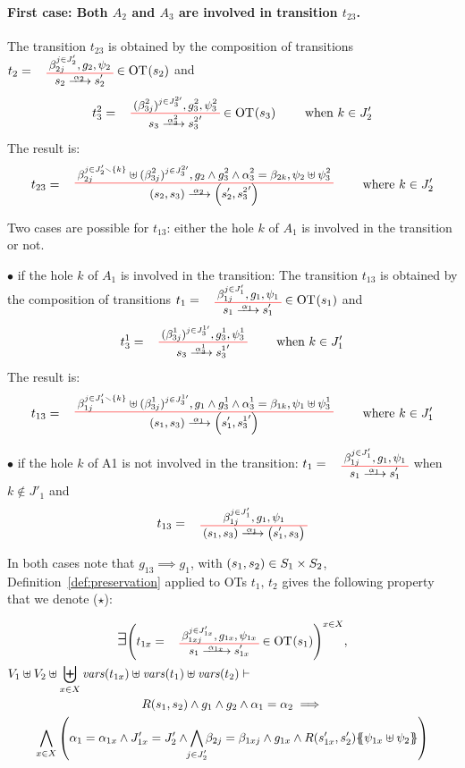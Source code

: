 \documentclass[runningheads]{llncs}
\begin{document}
\begin{enumerate}
\paragraph{First case: Both $A_2$ and $A_3$ are involved in transition $t_{23}$.}
The transition $t_{23}$ is obtained by the composition of  transitions $t_2=\OTx{2}{}{2}{2}\in\fOT{s_2}$ and  \[t_3^2=
\OT{ s_3}{{s^2_3}'}{\alpha_3^2}{   {(\beta^2_{3j})^{j \in J^{2 \prime}_3} }}{ g^2_3 }{ \psi^2_3}\in\fOT{s_3} \qquad \text{ when } k \in J'_{2} 
\] The result is:
\[
t_{23} = \OT{\mpar{s_2, s_3}}{\mpar{s'_2, {s^2_3}'}}{\alpha_2}{\beta_{2j}^{j \in J'_2 \setminus \{k\}} \uplus  {(\beta^2_{3j})^{j \in J^{2 \prime}_3} }}{g_2 \wedge g^2_3 \wedge \alpha^2_3 = \beta_{2k}}{\psi_2 \uplus \psi^2_3} \qquad \text{ where } k \in J'_{2} 
\]

Two cases are possible for $t_{13}$: either the hole $k$ of $A_1$ is involved in the transition or not.

$\bullet$ if  the hole $k$ of $A_1$ is involved in the transition: 
The transition $t_{13}$ is obtained by the composition of  transitions $t_1=\OTx{1}{}{1}{1}\in\fOT{s_1}$ and  \[t_3^1=
\OT{ s_3}{{s^1_3}'}{\alpha_3^1}{   {(\beta^1_{3j})^{j \in J^{1 \prime}_3} }}{ g^1_3 }{ \psi^1_3} \qquad \text{ when } k \in J'_{1} 
\] The result is:
\[
t_{13} = \OT{\mpar{s_1, s_3}}{\mpar{s'_1, {s^1_3}'}}{\alpha_1}{\beta_{1j}^{j \in J'_1 \setminus \{k\}} \uplus  {(\beta^1_{3j})^{j \in J^{1 \prime}_3} }}{g_1 \wedge g^1_3 \wedge \alpha^1_3 = \beta_{1k}}{\psi_1 \uplus \psi^1_3} \qquad \text{ where } k \in J'_{1} 
\]

$\bullet$ if  the hole $k$ of A1 is not involved in the transition:
$t_1=\OTx{1}{}{1}{1}$ when  $k \not\in J'_{1} $
and 
\[
t_{13} = \OT{\mpar{s_1, s_3}}{\mpar{s'_1, {s_3}}}{\alpha_1}{\beta_{1j}^{j \in J'_1}}{g_1}{\psi_1}
\]

\smallskip
In both cases note that $g_{13} \implies g_1$, with  ${\left(s_1, s_2\right)} \in S_1 \times S_2$, Definition~\ref{def:preservation} applied to OTs $t_1,\,t_2$ gives the following property that we denote ($\star$):

\begin{multline*}
\bigexists 
\mpar{t_{1x} = \OTx{1}{x}{1x}{1x} \in \fOT{s_1}}^{x \in X},\\
  V_1 \uplus V_2 \uplus \biguplus_{x\in X}\fvars{t_{1x}} \uplus \fvars{t_1} \uplus \fvars{t_2} \vdash \hspace{6cm}\\  R\mpar{s_1, s_2} \wedge 	g_1 \wedge g_2 \wedge \alpha_1 = \alpha_2 
\implies \\
\bigwedge_{x\in X}
\mpar{
\alpha_1=\alpha_{1 x}  \land J'_{1x}= J'_2 \land \bigwedge_\subbox{j \in J'_2 } \beta_{2j} = \beta_{1xj}\land g_{1 x}\land
 R\mpar{s'_{1 x}, s'_2}\psubst{\psi_{1 x} \uplus \psi_2}}
\end{multline*}


\end{enumerate}
\end{document}
